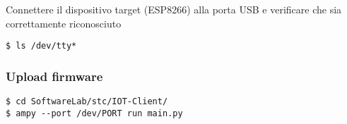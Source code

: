 \documentclass[onecolumn,a4paper]{article}
\begin{document}
Connettere il dispositivo target (ESP8266) alla porta USB e verificare che sia correttamente riconosciuto
\begin{verbatim}
$ ls /dev/tty* 
\end{verbatim}

\subsubsection{Upload firmware}
\label{sec:orga9441c2}

\begin{verbatim}
$ cd SoftwareLab/stc/IOT-Client/
$ ampy --port /dev/PORT run main.py
\end{verbatim}
\end{document}
